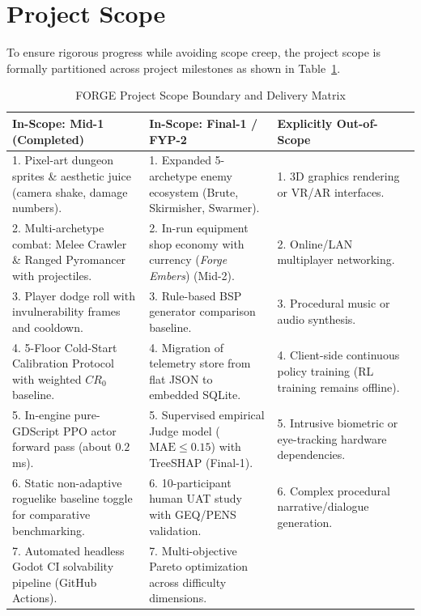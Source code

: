 \section{Project Scope}\label{sec:scope}
To ensure rigorous progress while avoiding scope creep, the project scope is formally partitioned across project milestones as shown in Table~\ref{tab:scope_matrix}.

\begin{table}[!htbp]
\centering
\caption{FORGE Project Scope Boundary and Delivery Matrix}
\label{tab:scope_matrix}
\small
\begin{tabular}{p{}p{}p{}}
\toprule
\textbf{In-Scope: Mid-1 (Completed)} & \textbf{In-Scope: Final-1 / FYP-2} & \textbf{Explicitly Out-of-Scope} \\
\midrule
1. Pixel-art dungeon sprites \& aesthetic juice (camera shake, damage numbers). & 1. Expanded 5-archetype enemy ecosystem (Brute, Skirmisher, Swarmer). & 1. 3D graphics rendering or VR/AR interfaces. \\
2. Multi-archetype combat: Melee Crawler \& Ranged Pyromancer with projectiles. & 2. In-run equipment shop economy with currency (\textit{Forge Embers}) (Mid-2). & 2. Online/LAN multiplayer networking. \\
3. Player dodge roll with invulnerability frames and cooldown. & 3. Rule-based BSP generator comparison baseline. & 3. Procedural music or audio synthesis. \\
4. 5-Floor Cold-Start Calibration Protocol with weighted $CR_0$ baseline. & 4. Migration of telemetry store from flat JSON to embedded SQLite. & 4. Client-side continuous policy training (RL training remains offline). \\
5. In-engine pure-GDScript PPO actor forward pass (about $0.2$\,ms). & 5. Supervised empirical Judge model ($\text{MAE} \le 0.15$) with TreeSHAP (Final-1). & 5. Intrusive biometric or eye-tracking hardware dependencies. \\
6. Static non-adaptive roguelike baseline toggle for comparative benchmarking. & 6. 10-participant human UAT study with GEQ/PENS validation. & 6. Complex procedural narrative/dialogue generation. \\
7. Automated headless Godot CI solvability pipeline (GitHub Actions). & 7. Multi-objective Pareto optimization across difficulty dimensions. & \\
\bottomrule
\end{tabular}
\end{table}


